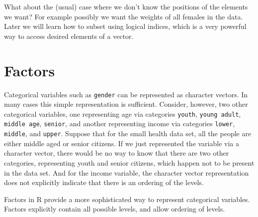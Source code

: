 \documentclass[12pt,oneside]{book}\usepackage[]{graphicx}\usepackage[]{color}
\begin{document}
What about the (usual) case where we don't know the positions of the elements we want? For example possibly we want the weights of all females in the data. Later we will learn how to subset using logical indices, which is a very powerful way to access desired elements of a vector.

\section{Factors}
Categorical variables such as \verb+gender+ can be represented as character vectors. In many cases this simple representation is sufficient. Consider, however, two other categorical variables, one representing age via categories \verb+youth+, \verb+young adult+, \verb+middle age+, \verb+senior+, and another representing income via categories \verb+lower+, \verb+middle+, and \verb+upper+. Suppose that for the small health data set, all the people are either middle aged or senior citizens. If we just represented the variable via a character vector, there would be no way to know that there are two other categories, representing youth and senior citizens, which happen not to be present in the data set. And for the income variable, the character vector representation does not explicitly indicate that there is an ordering of the levels.

Factors in R provide a more sophisticated way to represent categorical variables. Factors explicitly contain all possible levels, and allow ordering of levels.
\end{document}
